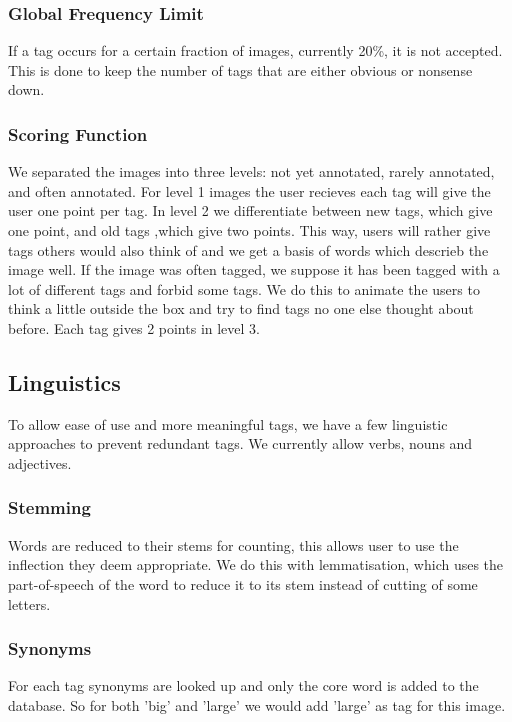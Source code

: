 \subsubsection{Global Frequency Limit}
\label{gacomphs19:sec:concepts:spamprevention:frequencylimit}
If a tag occurs for a certain fraction of images, currently 20\%, it is not accepted. This is done to keep the number of tags that are either obvious or nonsense down.

\subsubsection{Scoring Function}
\label{gacomphs19:sec:concepts:spamprevention:scoringfunction}
We separated the images into three levels: not yet annotated, rarely annotated, and often annotated. For level 1 images the user recieves each tag will give the user one point per tag. In level 2 we differentiate between new tags, which give one point, and old tags ,which give two points. This way, users will rather give tags others would also think of and we get a basis of words which descrieb the image well. If the image was often tagged, we suppose it has been tagged with a lot of different tags and forbid some tags. We do this to animate the users to think a little outside the box and try to find tags no one else thought about before. Each tag gives 2 points in level 3.


\subsection{Linguistics}
\label{gacomphs19:sec:concepts:linguistics}
To allow ease of use and more meaningful tags, we have a few linguistic approaches to prevent redundant tags. We currently allow verbs, nouns and adjectives.



\subsubsection{Stemming}
\label{gacomphs19:sec:concepts:linguistics:stemming}
Words are reduced to their stems for counting, this allows user to use the inflection they deem appropriate. We do this with lemmatisation, which uses the part-of-speech of the word to reduce it to its stem instead of cutting of some letters.


\subsubsection{Synonyms}
\label{gacomphs19:sec:concepts:linguistics:synonyms}
For each tag synonyms are looked up and only the core word is added to the database. So for both 'big' and 'large' we would add 'large' as tag for this image.



